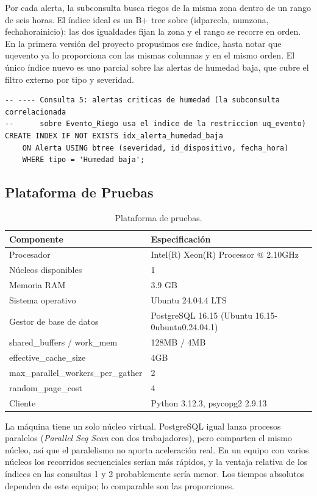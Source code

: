 \documentclass[11pt,letterpaper]{article}
\newcommand{\tbus}{\textunderscore\allowbreak}
\newcommand{\tb}[1]{{\ttfamily\let\_\tbus #1}}
\begin{document}
Por cada alerta, la subconsulta busca riegos de la misma zona dentro de un rango de seis horas. El índice ideal es un B+ tree sobre (\tb{id\_parcela}, \tb{num\_zona}, \tb{fecha\_hora\_inicio}): las dos igualdades fijan la zona y el rango se recorre en orden. En la primera versión del proyecto propusimos ese índice, hasta notar que \tb{uq\_evento} ya lo proporciona con las mismas columnas y en el mismo orden. El único índice nuevo es uno parcial sobre las alertas de humedad baja, que cubre el filtro externo por tipo y severidad.

\begin{lstlisting}[style=sql]
-- ---- Consulta 5: alertas criticas de humedad (la subconsulta correlacionada
--      sobre Evento_Riego usa el indice de la restriccion uq_evento)
CREATE INDEX IF NOT EXISTS idx_alerta_humedad_baja
    ON Alerta USING btree (severidad, id_dispositivo, fecha_hora)
    WHERE tipo = 'Humedad baja';
\end{lstlisting}


\subsection{Plataforma de Pruebas}

\begin{table}[H]
\centering\small
\begin{tabular}{ll}
\toprule
Componente & Especificación \\
\midrule
Procesador & Intel(R) Xeon(R) Processor @ 2.10GHz \\
Núcleos disponibles & 1 \\
Memoria RAM & 3.9 GB \\
Sistema operativo & Ubuntu 24.04.4 LTS \\
Gestor de base de datos & PostgreSQL 16.15 (Ubuntu 16.15-0ubuntu0.24.04.1) \\
shared\_buffers / work\_mem & 128MB / 4MB \\
effective\_cache\_size & 4GB \\
max\_parallel\_workers\_per\_gather & 2 \\
random\_page\_cost & 4 \\
Cliente & Python 3.12.3, psycopg2 2.9.13 \\
\bottomrule
\end{tabular}
\caption{Plataforma de pruebas.}\label{tab:plataforma}
\end{table}


La máquina tiene un solo núcleo virtual. PostgreSQL igual lanza procesos paralelos (\emph{Parallel Seq Scan} con dos trabajadores), pero comparten el mismo núcleo, así que el paralelismo no aporta aceleración real. En un equipo con varios núcleos los recorridos secuenciales serían más rápidos, y la ventaja relativa de los índices en las consultas 1 y 2 probablemente sería menor. Los tiempos absolutos dependen de este equipo; lo comparable son las proporciones.
\end{document}
